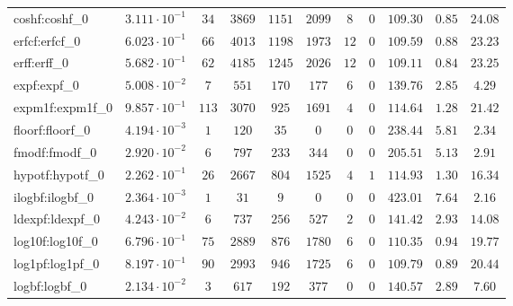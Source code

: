 \begin{tabular}{|l|c|c|c|c|c|c|c|c|c|c|}
coshf:coshf\_0               & $ 3.111 \cdot 10^{-1} $ & $ 34     $ & $ 3869  $ & $ 1151  $ & $ 2099  $ & $ 8   $ & $ 0 $ & $ 109.30      $ & $ 0.85    $ & $ 24.08   $ \\
erfcf:erfcf\_0               & $ 6.023 \cdot 10^{-1} $ & $ 66     $ & $ 4013  $ & $ 1198  $ & $ 1973  $ & $ 12  $ & $ 0 $ & $ 109.59      $ & $ 0.88    $ & $ 23.23   $ \\
erff:erff\_0                 & $ 5.682 \cdot 10^{-1} $ & $ 62     $ & $ 4185  $ & $ 1245  $ & $ 2026  $ & $ 12  $ & $ 0 $ & $ 109.11      $ & $ 0.84    $ & $ 23.25   $ \\
expf:expf\_0                 & $ 5.008 \cdot 10^{-2} $ & $ 7      $ & $ 551   $ & $ 170   $ & $ 177   $ & $ 6   $ & $ 0 $ & $ 139.76      $ & $ 2.85    $ & $ 4.29    $ \\
expm1f:expm1f\_0             & $ 9.857 \cdot 10^{-1} $ & $ 113    $ & $ 3070  $ & $ 925   $ & $ 1691  $ & $ 4   $ & $ 0 $ & $ 114.64      $ & $ 1.28    $ & $ 21.42   $ \\
floorf:floorf\_0             & $ 4.194 \cdot 10^{-3} $ & $ 1      $ & $ 120   $ & $ 35    $ & $ 0     $ & $ 0   $ & $ 0 $ & $ 238.44      $ & $ 5.81    $ & $ 2.34    $ \\
fmodf:fmodf\_0               & $ 2.920 \cdot 10^{-2} $ & $ 6      $ & $ 797   $ & $ 233   $ & $ 344   $ & $ 0   $ & $ 0 $ & $ 205.51      $ & $ 5.13    $ & $ 2.91    $ \\
hypotf:hypotf\_0             & $ 2.262 \cdot 10^{-1} $ & $ 26     $ & $ 2667  $ & $ 804   $ & $ 1525  $ & $ 4   $ & $ 1 $ & $ 114.93      $ & $ 1.30    $ & $ 16.34   $ \\
ilogbf:ilogbf\_0             & $ 2.364 \cdot 10^{-3} $ & $ 1      $ & $ 31    $ & $ 9     $ & $ 0     $ & $ 0   $ & $ 0 $ & $ 423.01      $ & $ 7.64    $ & $ 2.16    $ \\
ldexpf:ldexpf\_0             & $ 4.243 \cdot 10^{-2} $ & $ 6      $ & $ 737   $ & $ 256   $ & $ 527   $ & $ 2   $ & $ 0 $ & $ 141.42      $ & $ 2.93    $ & $ 14.08   $ \\
log10f:log10f\_0             & $ 6.796 \cdot 10^{-1} $ & $ 75     $ & $ 2889  $ & $ 876   $ & $ 1780  $ & $ 6   $ & $ 0 $ & $ 110.35      $ & $ 0.94    $ & $ 19.77   $ \\
log1pf:log1pf\_0             & $ 8.197 \cdot 10^{-1} $ & $ 90     $ & $ 2993  $ & $ 946   $ & $ 1725  $ & $ 6   $ & $ 0 $ & $ 109.79      $ & $ 0.89    $ & $ 20.44   $ \\
logbf:logbf\_0               & $ 2.134 \cdot 10^{-2} $ & $ 3      $ & $ 617   $ & $ 192   $ & $ 377   $ & $ 0   $ & $ 0 $ & $ 140.57      $ & $ 2.89    $ & $ 7.60    $ \\

\end{tabular}
